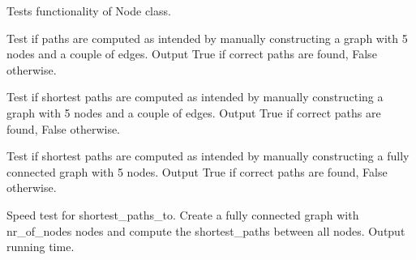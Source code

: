 \documentclass[letterpaper,10pt,english]{sphinxmanual}
\begin{document}
\label{tests:module-tests_node}

\begin{fulllineitems}
\label{tests:tests_node.NodeTests}
Tests functionality of Node class.

\begin{fulllineitems}
\label{tests:tests_node.NodeTests.path_test1}
Test if paths are computed as intended by
manually constructing a graph with 5 nodes
and a couple of edges. Output True if correct
paths are found, False otherwise.

\end{fulllineitems}


\begin{fulllineitems}
\label{tests:tests_node.NodeTests.path_test2}
Test if shortest paths are computed as intended 
by manually constructing a graph with 5 nodes
and a couple of edges. Output True if correct
paths are found, False otherwise.

\end{fulllineitems}


\begin{fulllineitems}
\label{tests:tests_node.NodeTests.path_test3}
Test if shortest paths are computed as intended 
by manually constructing a  fully connected
graph with 5 nodes. Output True if correct
paths are found, False otherwise.

\end{fulllineitems}


\begin{fulllineitems}
\label{tests:tests_node.NodeTests.path_test_all}
\end{fulllineitems}


\begin{fulllineitems}
\label{tests:tests_node.NodeTests.worst_case_test}
Speed test for shortest\_paths\_to.
Create a fully connected graph with
nr\_of\_nodes nodes and compute the
shortest\_paths between all nodes.
Output running time.

\end{fulllineitems}


\end{fulllineitems}
\end{document}
